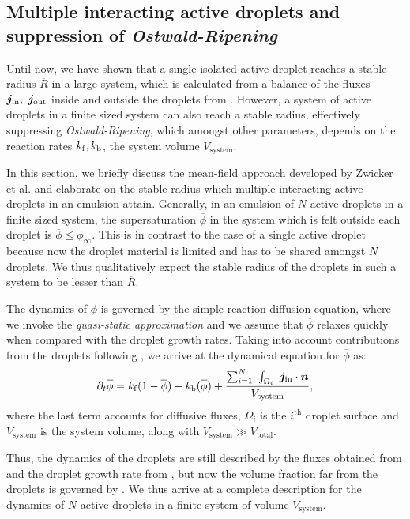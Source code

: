 \subsection{Multiple interacting active droplets and suppression of \textit{Ostwald-Ripening}}

Until now, we have shown that a single isolated active droplet reaches a stable radius $\overline{R}$ in a large system, which is calculated from a balance of the fluxes $\boldsymbol{j}_\mathrm{in},~ \boldsymbol{j}_\mathrm{out}$ inside and outside the droplets from .
However, a system of active droplets in a finite sized system can also reach a stable radius, effectively suppressing \textit{Ostwald-Ripening}, which amongst other parameters, depends on the reaction rates $k_\mathrm{f}, k_\mathrm{b}$, the system volume $V_\mathrm{system}$.

In this section, we briefly discuss the mean-field approach developed by Zwicker et al. \cite{Zwicker2015} and elaborate on the stable radius which multiple interacting active droplets in an emulsion attain.
Generally, in an emulsion of $N$ active droplets in a finite sized system, the supersaturation $\overline{\phi}$ in the system which is felt outside each droplet is $\overline{\phi} \leq \phi_\infty$.
This is in contrast to the case of a single active droplet because now the droplet material is limited and has to be shared amongst $N$ droplets.
We thus qualitatively expect the stable radius of the droplets in such a system to be lesser than $\overline{R}$.

The dynamics of $\overline{\phi}$ is governed by the simple reaction-diffusion equation, where we invoke the \textit{quasi-static approximation} and we assume that $\overline{\phi}$ relaxes quickly when compared with the droplet growth rates. 
Taking into account contributions from the droplets following , we arrive at the dynamical equation for $\overline{\phi}$ as:
\begin{equation}
\label{eqn:phi_dynamics}
    \partial_t \overline{\phi} = k_\mathrm{f} (1- \overline{\phi}) - k_\mathrm{b} (\overline{\phi}) + \frac{\sum_{i=1}^{N}~ \int_{\Omega_{i}} ~ \boldsymbol{j}_\mathrm{in}\cdot \boldsymbol{n}}{V_\mathrm{system}},
\end{equation}
where the last term accounts for diffusive fluxes, $\Omega_i$ is the $i^\mathrm{th}$ droplet surface and $V_\mathrm{system}$ is the system volume, along with $V_\mathrm{system} \gg V_\mathrm{total}$. 

Thus, the dynamics of the droplets are still described by the fluxes obtained from   and the droplet growth rate from , but now the volume fraction far from the droplets is governed by .
We thus arrive at a complete description for the dynamics of $N$ active droplets in a finite system of volume $V_\mathrm{system}$. 

